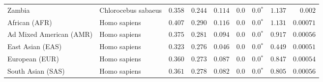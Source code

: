 \begin{center}
\begin{adjustbox}{width = 1\textwidth}
\begin{tabular}{|l|l|r|r|r|r|r|r|r|}
            Zambia        & Chlorocebus sabaeus        & $ 0.358$ & $ 0.244$ & $ 0.114$ & $0.0$ & $\bm{0.0{^*}}$ & $ 1.137$ & $ 0.002$ \\
            African (AFR)               & Homo sapiens        & $ 0.407$ & $ 0.290$ & $ 0.116$ & $0.0$ & $\bm{0.0{^*}}$ & $ 1.131$ & $0.00071$ \\
            Ad Mixed American (AMR)                 & Homo sapiens        & $ 0.375$ & $ 0.281$ & $ 0.094$ & $0.0$ & $\bm{0.0{^*}}$ & $ 0.917$ & $0.00056$ \\
            East Asian (EAS)              & Homo sapiens        & $ 0.323$ & $ 0.276$ & $ 0.046$ & $0.0$ & $\bm{0.0{^*}}$ & $ 0.449$ & $0.00051$ \\
            European (EUR)              & Homo sapiens        & $ 0.360$ & $ 0.273$ & $ 0.087$ & $0.0$ & $\bm{0.0{^*}}$ & $ 0.847$ & $0.00054$ \\
            South Asian (SAS)              & Homo sapiens        & $ 0.361$ & $ 0.278$ & $ 0.082$ & $0.0$ & $\bm{0.0{^*}}$ & $ 0.805$ & $0.00056$ \\
            \bottomrule
        \end{tabular}
    \end{adjustbox}
    \newpage
\end{center}

